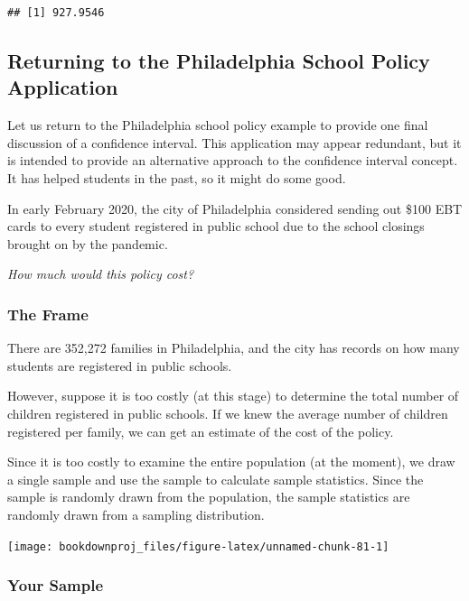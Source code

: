 \documentclass[
]{book}
\begin{document}
\begin{verbatim}
## [1] 927.9546
\end{verbatim}

\subsection{Returning to the Philadelphia School Policy Application}\label{returning-to-the-philadelphia-school-policy-application}

Let us return to the Philadelphia school policy example to provide one final discussion of a confidence interval. This application may appear redundant, but it is intended to provide an alternative approach to the confidence interval concept. It has helped students in the past, so it might do some good.

In early February 2020, the city of Philadelphia considered sending out \$100 EBT cards to every student registered in public school due to the school closings brought on by the pandemic.

\emph{How much would this policy cost?}

\subsubsection*{The Frame}\label{the-frame}

There are 352,272 families in Philadelphia, and the city has records on how many students are registered in public schools.

However, suppose it is too costly (at this stage) to determine the total number of children registered in public schools. If we knew the average number of children registered per family, we can get an estimate of the cost of the policy.

Since it is too costly to examine the entire population (at the moment), we draw a single sample and use the sample to calculate sample statistics. Since the sample is randomly drawn from the population, the sample statistics are randomly drawn from a sampling distribution.

\begin{center}\texttt{[image: bookdownproj\_files/figure-latex/unnamed-chunk-81-1]} \end{center}

\subsubsection*{Your Sample}\label{your-sample}
\end{document}
